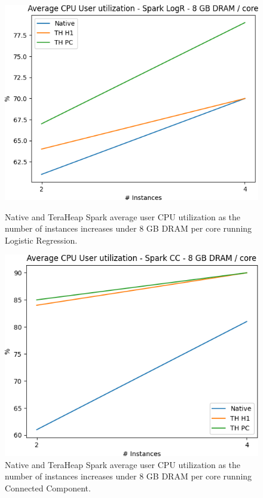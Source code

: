 \begin{figure}[thbp]
        \centering
   \includegraphics[width=\linewidth]{./fig/LOGR_64_USR.png}
    \caption{Native and TeraHeap Spark average user CPU utilization
        as the number of instances increases under 8 GB DRAM per core running Logistic Regression.}
           \label{fig:logr_64_usr}
	\includegraphics[width=\linewidth]{./fig/CC_64_USR.png}
    \caption{Native and TeraHeap Spark average user CPU utilization
        as the number of instances increases under 8 GB DRAM per core running Connected Component.}
        \label{fig:cc_64_usr}
\end{figure}

